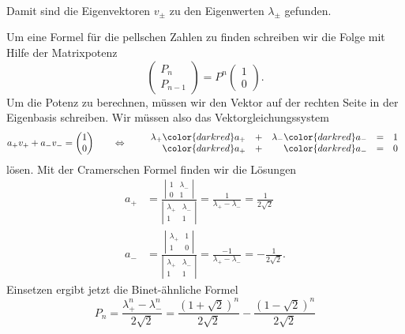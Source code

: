 \begin{loesung}
\begin{teilaufgaben}
\begin{align*}
\end{align*}
Damit sind die Eigenvektoren $v_{\pm}$ zu den Eigenwerten $\lambda_{\pm}$
gefunden.
\item
Um eine Formel für die pellschen Zahlen zu finden schreiben wir die Folge
mit Hilfe der Matrixpotenz
\[
\begin{pmatrix}
P_{n}\\
P_{n-1}
\end{pmatrix}
=
P^n
\begin{pmatrix}1\\0\end{pmatrix}.
\]
Um die Potenz zu berechnen, müssen wir den Vektor auf der rechten Seite
in der Eigenbasis schreiben.
Wir müssen also das Vektorgleichungssystem
\[
a_+v_+ + a_-v_- = \begin{pmatrix}1\\0\end{pmatrix}
\qquad\Leftrightarrow\qquad
\begin{array}{rcrcl}
\lambda_+ {\color{darkred}a_+} &+& \lambda_- {\color{darkred}a_-} &=& 1 \\
          {\color{darkred}a_+} &+&           {\color{darkred}a_-} &=& 0
\end{array}
\]
lösen.
Mit der Cramerschen Formel finden wir die Lösungen
\begin{align*}
a_+
&=
\frac{
\left|\begin{matrix}1&\lambda_-\\0&1\end{matrix}\right|
}{
\left|\begin{matrix}\lambda_+&\lambda_-\\1&1\end{matrix}\right|
}
=
\frac{1}{\lambda_+-\lambda_-}
=
\frac{1}{2\!\sqrt{2}}
\\
a_-
&=
\frac{
\left|\begin{matrix}\lambda_+&1\\1&0\end{matrix}\right|
}{
\left|\begin{matrix}\lambda_+&\lambda_-\\1&1\end{matrix}\right|
}
=
\frac{-1}{\lambda_+-\lambda_-}
=
-\frac{1}{2\!\sqrt{2}}.
\end{align*}
Einsetzen ergibt jetzt die Binet-ähnliche Formel
\begin{equation}
P_n
=
\frac{\lambda_+^n - \lambda_-^n}{2\!\sqrt{2}}
=
\frac{(1+\!\sqrt{2})^n}{2\!\sqrt{2}}
-
\frac{(1-\!\sqrt{2})^n}{2\!\sqrt{2}}
\label{80000046:binet}

\end{equation}
\end{teilaufgaben}
\end{loesung}

